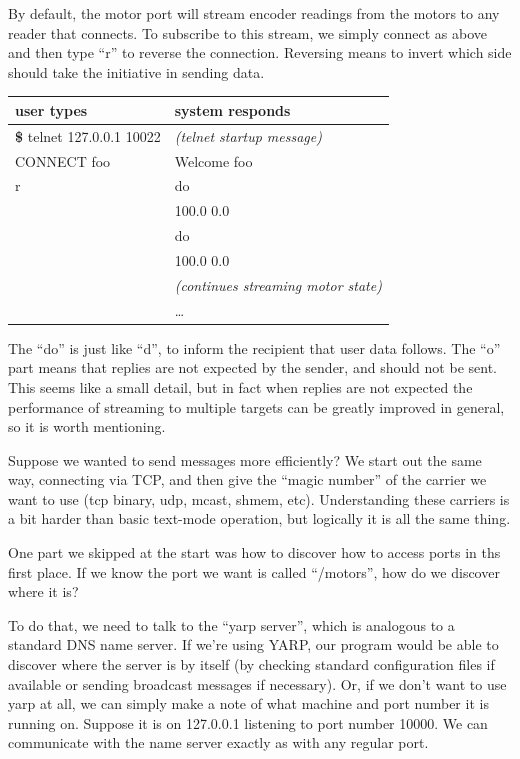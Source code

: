 By default, the motor port will stream encoder readings from the motors
to any reader that connects.  To subscribe to this stream, we simply
connect as above and then type ``r'' to reverse the connection.
Reversing means to invert which side should take the initiative
in sending data.


\begin{center}
\begin{tabular}{ll}
\hline\hline
{\bf user types} & {\bf system responds} \\
\hline
{\bf \$} telnet 127.0.0.1 10022 & {\it (telnet startup message)} \\
CONNECT foo & Welcome foo \\
r & do \\
& 100.0 0.0 \\
 & do \\
 & 100.0 0.0 \\
 & {\it (continues streaming motor state)} \\
 & \ldots \\
\hline\hline
\end{tabular}
\end{center}


The ``do'' is just like ``d'', to inform the recipient that user data
follows.  The ``o'' part means that replies are not expected by the
sender, and should not be sent.  This seems like a small detail,
but in fact when replies are not expected the performance of 
streaming to multiple targets can be greatly improved in general,
so it is worth mentioning.

Suppose we wanted to send messages more efficiently?  We start out the
same way, connecting via TCP, and then give the ``magic number'' of
the carrier we want to use (tcp binary, udp, mcast, shmem, etc).
Understanding these carriers is a bit harder than basic text-mode operation,
but logically it is all the same thing.

One part we skipped at the start was how to discover how to 
access ports in ths first place.  If we know the port we want
is called ``/motors'', how do we discover where it is?

To do that, we need to talk to the ``yarp server'', which is analogous
to a standard DNS name server.  If we're using YARP, our program would
be able to discover where the server is by itself (by checking
standard configuration files if available or sending broadcast
messages if necessary).  Or, if we don't want to use yarp at all, we
can simply make a note of what machine and port number it is running
on.  Suppose it is on 127.0.0.1 listening to port number 10000.
We can communicate with the name server exactly as with any regular
port.


